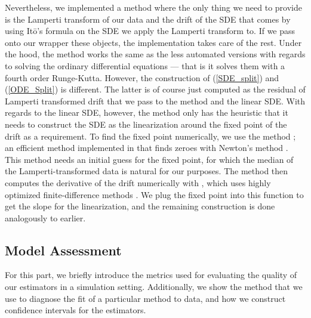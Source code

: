 Nevertheless, we implemented a method where the only thing we need to provide is the Lamperti transform of our data and the drift of the SDE that comes by using Itō's formula on the SDE we apply the Lamperti transform to. If we pass onto our wrapper these objects, the implementation takes care of the rest. Under the hood, the method works the same as the less automated versions with regards to solving the ordinary differential equations — that is it solves them with a fourth order Runge-Kutta. However, the construction of (\ref{SDE_split}) and (\ref{ODE_Split}) is different. The latter is of course just computed as the residual of Lamperti transformed drift that we pass to the method and the linear SDE. With regards to the linear SDE, however, the method only has the heuristic that it needs to construct the SDE as the linearization around the fixed point of the drift as a requirement. To find the fixed point numerically, we use the method ; an efficient method implemented in  that finds zeroes with Newton's method \cite{nleqslv}. This method needs an initial guess for the fixed point, for which the median of the Lamperti-transformed data is natural for our purposes. The method then computes the derivative of the drift numerically with , which uses highly optimized finite-difference methods \cite{numDeriv}. We plug the fixed point into this function to get the slope for the linearization, and the remaining construction is done analogously to earlier.
\subsection{Model Assessment}
For this part, we briefly introduce the metrics used for evaluating the quality of our estimators in a simulation setting. Additionally, we show the method that we use to diagnose the fit of a particular method to data, and how we construct confidence intervals for the estimators.
